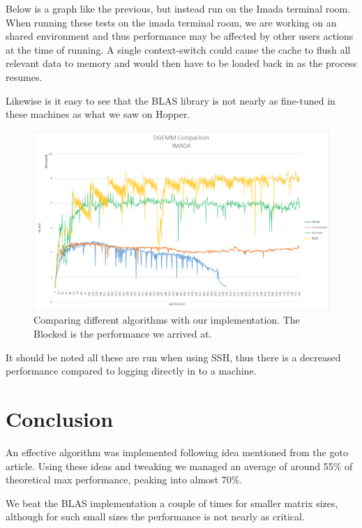 \documentclass[a4paper,11pt,oneside]{book}
\begin{document}
Below is a graph like the previous, but instead run on the Imada terminal room. When running these tests on the imada terminal room, we are working on an shared environment and thus performance may be affected by other users actions at the time of running. A single context-switch could cause the cache to flush all relevant data to memory and would then have to be loaded back in as the process resumes.

Likewise is it easy to see that the BLAS library is not nearly as fine-tuned in these machines as what we saw on Hopper.

\begin{figure}[H]
  \centering
  \includegraphics[width=0.9\linewidth]{comparison-graph-imada.png}
  \caption{Comparing different algorithms with our implementation. The Blocked is the performance we arrived at.}
  \centering
  \label{fig:sub1}
\end{figure}

It should be noted all these are run when using SSH, thus there is a decreased performance compared to logging directly in to a machine.

\chapter{Conclusion}
An effective algorithm was implemented following idea mentioned from the goto article. Using these ideas and tweaking we managed an average of around 55\% of theoretical max performance, peaking into almost 70\%. 

We beat the BLAS implementation a couple of times for smaller matrix sizes, although for such small sizes the performance is not nearly as critical.


\end{document}
